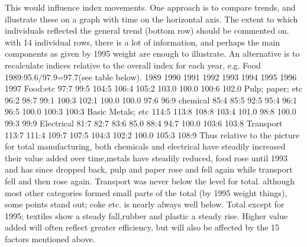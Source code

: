 \documentclass[a4paper,12pt]{article}
\begin{document}
\begin{enumerate}
\begin{itemize}
\end{itemize}
 This
would influence index movements.
One approach is to compare trends, and illustrate these on a graph with time on the
horizontal axis. The extent to which individuals reflected the general trend (bottom
row) should be commented on. with 14 individual rows, there is a lot of information,
and perhaps the main components as given by 1995 weight are enough to illustrate.
An alternative is to recalculate indices relative to the overall index for each year, e.g.
Food 1989:95.6/97.9=97.7(see table below).
1989 1990 1991 1992 1993 1994 1995 1996 1997
Food:etc 97:7 99:5 104:5 106:4 105:2 103.0 100.0 100:6 102.0
Pulp; paper; etc 96:2 98:7 99:1 100:3 102:1 100.0 100.0 97:6 96:9
chemical 85:4 85:5 92:5 95:4 96:1 96:5 100.0 100:3 100:3
Basic Metals; etc 114:5 113:8 108:8 103:4 101.0 98:8 100.0 99:3 99:9
Electrical 81:7 82:7 83:6 85.0 88:4 94:7 100.0 103:6 103:8
Transport 113:7 111:4 109:7 107:5 104:3 102:2 100.0 105:3 108:9
Thus relative to the picture for total manufacturing, both chemicals and electrical have
steadily increased their value added over time,metals have steadily reduced, food rose
until 1993 and has since dropped back, pulp and paper rose and fell again while transport
fell and then rose again.
Transport was never below the level for total.
although most other categories formed small parts of the total (by 1995 weight things),
some points stand out; coke etc. is nearly always well below. Total except for 1995;
textiles show a steady fall,rubber and plastic a steady rise.
Higher value added will often reflect greater efficiency, but will also be affected by the
15
factors mentioned above.
\end{enumerate}
\end{document}
